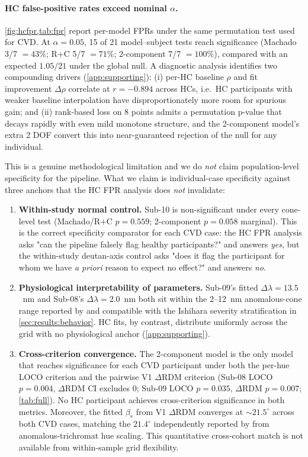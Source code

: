 \paragraph{HC false-positive rates exceed nominal $\alpha$.}
\cref{fig:hcfpr,tab:fpr} report per-model FPRs under the same
permutation test used for CVD. At $\alpha = 0.05$, 15 of 21
model--subject tests reach significance (Machado 3/7 $= 43\%$; R+C
5/7 $= 71\%$; 2-component 7/7 $= 100\%$), compared with an expected
$1.05/21$ under the global null. A diagnostic analysis identifies two
compounding drivers (\cref{app:supporting}): (i) per-HC baseline
$\rho$ and fit improvement $\Delta\rho$ correlate at $r = -0.894$
across HCs, i.e.\ HC participants with weaker baseline interpolation
have disproportionately more room for spurious gain; and
(ii) rank-based loss on 8 points admits a permutation p-value that
decays rapidly with even mild monotone structure, and the 2-component
model's extra 2 DOF convert this into near-guaranteed rejection of
the null for any individual.

This is a genuine methodological limitation and we do \emph{not} claim
population-level specificity for the pipeline. What we claim is
individual-case specificity against three anchors that the HC FPR
analysis does \emph{not} invalidate:

\begin{enumerate}
\item \textbf{Within-study normal control.} Sub-10 is
non-significant under every cone-level test (Machado/R+C
$p = 0.559$; 2-component $p = 0.058$ marginal). This is the correct
specificity comparator for each CVD case: the HC FPR analysis asks
"can the pipeline falsely flag healthy participants?" and answers
\emph{yes}, but the within-study deutan-axis control asks "does it
flag the participant for whom we have \emph{a priori} reason to expect
no effect?" and answers \emph{no}.
\item \textbf{Physiological interpretability of parameters.} Sub-09's
fitted $\Delta\lambda = 13.5$~nm and Sub-08's
$\Delta\lambda = 2.0$~nm both sit within the 2--12~nm anomalous-cone
range reported by \citet{neitz2011} and compatible with the Ishihara
severity stratification in \cref{sec:results:behavior}. HC fits, by
contrast, distribute uniformly across the grid with no physiological
anchor (\cref{app:supporting}).
\item \textbf{Cross-criterion convergence.} The 2-component model is
the only model that reaches significance for each CVD participant
under both the per-hue LOCO criterion and the pairwise V1 $\Delta$RDM
criterion (Sub-08 LOCO $p = 0.004$, $\Delta$RDM CI excludes 0;
Sub-09 LOCO $p = 0.035$, $\Delta$RDM $p = 0.007$;
\cref{tab:full}). No HC participant achieves cross-criterion
significance in both metrics.
Moreover, the fitted $\beta_s$ from V1 $\Delta$RDM converges at
$\sim 21.5^\circ$ across both CVD cases, matching the $21.4^\circ$
independently reported by \citet{emery2021} from anomalous-trichromat
hue scaling. This quantitative cross-cohort match is not available
from within-sample grid flexibility.
\end{enumerate}

